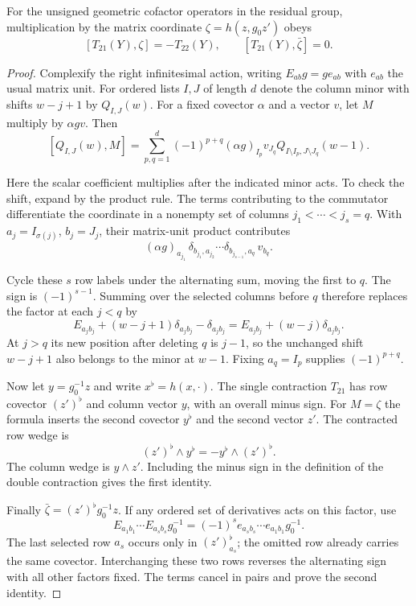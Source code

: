 \begin{auxlemma}\label{lem:residual-cofactor-commutator}
For the unsigned geometric cofactor operators in the residual group,
multiplication by the matrix coordinate \(\zeta=h(z,g_0z')\) obeys
\[
 [T_{21}(Y),\zeta]=-T_{22}(Y),\qquad
 [T_{21}(Y),\bar\zeta]=0.
\]
\end{auxlemma}
\begin{proof}
Complexify the right infinitesimal action, writing
\(E_{ab}g=g e_{ab}\) with \(e_{ab}\) the usual matrix unit.
For ordered lists \(I,J\) of length \(d\) denote the column minor
with shifts \(w-j+1\) by \(Q_{I,J}(w)\). For a fixed covector
\(\alpha\) and a vector \(v\), let \(M\) multiply by \(\alpha g v\).
Then
\[
 [Q_{I,J}(w),M]
   =\sum_{p,q=1}^d(-1)^{p+q}(\alpha g)_{I_p}v_{J_q}
              Q_{I\setminus I_p,J\setminus J_q}(w-1).
\]

Here the scalar coefficient multiplies after the indicated minor acts.
To check the shift, expand by the product rule. The terms contributing
to the commutator differentiate the coordinate in a nonempty set of
columns \(j_1<\cdots<j_s=q\). With \(a_j=I_{\sigma(j)}\),
\(b_j=J_j\), their matrix-unit product contributes
\[
 (\alpha g)_{a_{j_1}}\,
 \delta_{b_{j_1},a_{j_2}}\cdots\delta_{b_{j_{s-1}},a_q}\,v_{b_q}.
\]

Cycle these \(s\) row labels under the alternating sum, moving the
first to \(q\). The sign is \((-1)^{s-1}\). Summing over the
selected columns before \(q\) therefore replaces the factor at
each \(j<q\) by
\[
 E_{a_jb_j}+(w-j+1)\delta_{a_jb_j}-\delta_{a_jb_j}
                    =E_{a_jb_j}+(w-j)\delta_{a_jb_j}.
\]
At \(j>q\) its new position after deleting \(q\) is \(j-1\),
so the unchanged shift \(w-j+1\) also belongs to the minor at
\(w-1\). Fixing \(a_q=I_p\) supplies \((-1)^{p+q}\).

Now let \(y=g_0^{-1}z\) and write \(x^\flat=h(x,\cdot)\).
The single contraction \(T_{21}\) has row covector \((z')^\flat\)
and column vector \(y\), with an overall minus sign. For \(M=\zeta\)
the formula inserts the second covector \(y^\flat\) and the second
vector \(z'\). The contracted row wedge is
\[
 (z')^\flat\wedge y^\flat=-y^\flat\wedge(z')^\flat .
\]
The column wedge is \(y\wedge z'\). Including the minus sign in
the definition of the double contraction gives the first identity.

Finally \(\bar\zeta=(z')^\flat g_0^{-1}z\). If any ordered set of
derivatives acts on this factor, use
\[
 E_{a_1 b_1}\cdots E_{a_s b_s}g_0^{-1}
       =(-1)^s e_{a_s b_s}\cdots e_{a_1 b_1}g_0^{-1}.
\]
The last selected row \(a_s\) occurs only in \((z')^\flat_{a_s}\);
the omitted row already carries the same covector. Interchanging
these two rows reverses the alternating sign with all other factors
fixed. The terms cancel in pairs and prove the second identity.
\end{proof}

